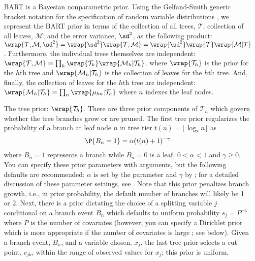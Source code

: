 \documentclass[article]{jss}
\begin{document}
BART is a Bayesian nonparametric prior.  Using the Gelfand-Smith
generic bracket notation for the specification of random variable
distributions \citep{GelfSmit90}, we represent the BART prior in terms
of the collection of all trees, $\mathcal{T}$; collection of all leaves,
$\mathcal{M}$; and the error variance, $\sd^2$, as the following
product: $\wrap{\mathcal{T}, \mathcal{M}, \sd^2}=
\wrap{\sd^2}\wrap{\mathcal{T}, \mathcal{M}}=
\wrap{\sd^2}\wrap{\mathcal{T}}\wrap{\mathcal{M}|\mathcal{T}}$.
Furthermore, the individual trees themselves are independent:
$\wrap{\mathcal{T}, \mathcal{M}}=\prod_h
\wrap{\mathcal{T}_h}\wrap{\mathcal{M}_h|\mathcal{T}_h}$.
where $\wrap{\mathcal{T}_h}$ is the prior for the $h$th tree and
$\wrap{\mathcal{M}_h|\mathcal{T}_h}$ is the collection of leaves for
the $h$th tree.  And, finally, the collection of leaves for the
$h$th tree are independent:
$\wrap{\mathcal{M}_h|\mathcal{T}_h}=
\prod_n\wrap{\mu_{hn}|\mathcal{T}_h}$
where $n$ indexes the leaf nodes.

The tree prior: $\wrap{\mathcal{T}_h}$.  There are three prior
components of $\mathcal{T}_h$ which govern whether the tree branches
grow or are pruned.
The first tree prior regularizes the probability of a branch at leaf
node $n$ in tree tier $t(n)=\lfloor\log_2 n\rfloor$ as
\begin{align}\label{regularity}
\P{B_n=1}=\alpha (t(n)+1)^{-\gamma}
\end{align}
where $B_n=1$ represents
a branch while $B_n=0$ is a leaf, $0<\alpha<1$ and $\gamma\ge 0$.  You
can specify these prior parameters with arguments, but the following
defaults are recommended: $\alpha$ is set by the parameter
 and $\gamma$ by ; for a detailed
discussion of these parameter settings, see \citet{ChipGeor98}.  Note
that this prior penalizes branch growth, i.e., in prior probability,
the default number of branches will likely be 1 or 2.  Next, there is
a prior dictating the choice of a splitting variable $j$ conditional on a
branch event $B_n$ which defaults to uniform probability $s_j=P^{-1}$ where
$P$ is the number of covariates (however, you can specify a Dirichlet
prior which is more appropriate if the number of covariates is large
\citep{Line16}; see below).  Given a branch event, $B_n$, and a
variable chosen, $x_j$, the last tree prior selects a cut point,
$c_{jk}$, within the range of observed values for $x_j$; this prior is
uniform.
\end{document}
